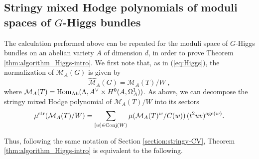 \documentclass[11pt,english]{amsart}
\numberwithin{equation}{section}
\numberwithin{figure}{section}
\theoremstyle{plain}
\theoremstyle{plain}
\theoremstyle{definition}
\theoremstyle{remark}
\newcommand{\Hom}{\operatorname{Hom}}
\newcommand{\age}{\operatorname{age}}
\newcommand{\str}{\textup{str}}
\newcommand{\Ab}{\textup{Ab}}
\begin{document}
\subsection{Stringy mixed Hodge polynomials of moduli spaces of $G$-Higgs bundles}\label{sec:mixedHodge-Higgs}

The calculation performed above can be repeated for the moduli space of $G$-Higgs bundles on an abelian variety $A$ of dimension $d$, in order to prove Theorem \ref{thm:algorithm_Higgs-intro}. We first note that, as in (\ref{eq:Higgs}), the normalization of $\mathcal{M}_A(G)$ is given by
$$
    \hat{\mathcal{M}}_A(G) = \mathcal{M}_A(T) / W\; ,
$$
where $\mathcal{M}_A(T) = \Hom_{\Ab}(\Lambda, A^\vee \times H^0(A, \Omega^1_A))$.  
As above, we can decompose the stringy mixed Hodge polynomial of $\mathcal{M}_A(T)/W$ into its sectors
$$
    \mu^{\str}(\mathcal{M}_A(T)/W) = \sum_{[w] \in \text{Conj}(W)} \mu(\mathcal{M}_A(T)^w / C(w))\, (t^{2}uv)^{\age(w)}.
$$


Thus, following the same notation of Section \ref{section:stringy-CV}, Theorem \ref{thm:algorithm_Higgs-intro} is equivalent to the following.
\end{document}
